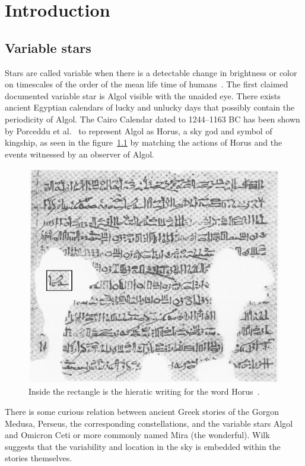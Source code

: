 \chapter{Introduction}\label{ch:intro}

\section{Variable stars}
Stars are called variable when there is a detectable change in brightness or color on timescales of the order
of the mean life time of humans~\cite{percy_2007, sterken_1996}.
The first claimed documented variable star is Algol visible with the unaided eye.
There exists ancient Egyptian calendars of lucky and unlucky days that possibly contain the periodicity of Algol\cite{porceddu_2008, porceddu_2018}.
The Cairo Calendar dated to 1244--1163 BC has been shown by Porceddu et al.~\cite{porceddu_2015} to represent Algol as Horus, a sky god and
symbol of kingship,
as seen in the figure~\ref{fig:horus} by matching the actions of Horus and the events witnessed by an observer of Algol.

\begin{figure}[h]
    \centering
    \includegraphics[width=\columnwidth]{figures/horus.eps}
    \caption{Inside the rectangle is the hieratic writing for the word Horus~\protect\cite{porceddu_2015}.}
\label{fig:horus}
\end{figure}

There is some curious relation between ancient Greek stories of the Gorgon Medusa, Perseus, the corresponding constellations, 
and the variable stars Algol and Omicron Ceti or more commonly named Mira (the wonderful).
Wilk~\cite{wilk_1996} suggests that the variability and location in the sky is embedded within the stories themselves.

